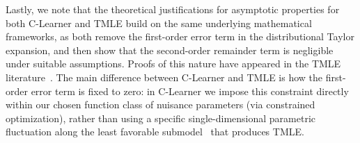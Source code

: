 Lastly, we note that the theoretical justifications for asymptotic properties for both C-Learner and TMLE build on the same underlying mathematical frameworks, as both remove the first-order error term in the distributional Taylor expansion, and then show that the second-order remainder term is negligible under suitable assumptions. 
Proofs of this nature have appeared in the TMLE literature~\citep{van2006targeted,van2011targeted,van2016one,van2017generally,van2023higher}. The main difference between C-Learner and TMLE is how the first-order error term is fixed to zero: in C-Learner we impose this constraint directly within our chosen function class of nuisance parameters (via constrained optimization), rather than using a specific single-dimensional parametric fluctuation along the least favorable submodel~\citep{bickel1993efficient} that produces TMLE. %




